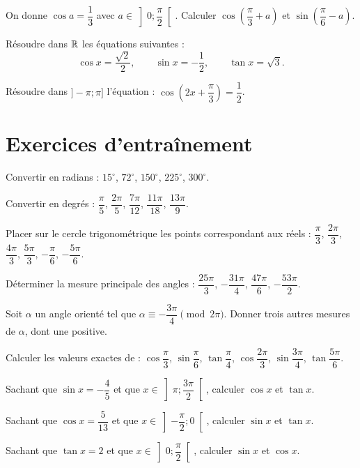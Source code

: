 \exo{}
On donne $\cos a = \dfrac{1}{3}$ avec $a \in \left]0;\dfrac{\pi}{2}\right[$. Calculer $\cos\left(\dfrac{\pi}{3}+a\right)$ et $\sin\left(\dfrac{\pi}{6}-a\right)$.


\exo{}
Résoudre dans $\mathbb{R}$ les équations suivantes :
\[
\cos x = \frac{\sqrt{2}}{2},\qquad \sin x = -\frac{1}{2},\qquad \tan x = \sqrt{3}.
\]

\exo{}
Résoudre dans $]-\pi;\pi]$ l'équation : $\cos\left(2x+\dfrac{\pi}{3}\right) = \dfrac{1}{2}$.

\section{Exercices d'entraînement}


\exo{}
Convertir en radians : $15^\circ$, $72^\circ$, $150^\circ$, $225^\circ$, $300^\circ$.

\exo{}
Convertir en degrés : $\dfrac{\pi}{5}$, $\dfrac{2\pi}{5}$, $\dfrac{7\pi}{12}$, $\dfrac{11\pi}{18}$, $\dfrac{13\pi}{9}$.

\exo{}
Placer sur le cercle trigonométrique les points correspondant aux réels : $\dfrac{\pi}{3}$, $\dfrac{2\pi}{3}$, $\dfrac{4\pi}{3}$, $\dfrac{5\pi}{3}$, $-\dfrac{\pi}{6}$, $-\dfrac{5\pi}{6}$.

\exo{}
Déterminer la mesure principale des angles : $\dfrac{25\pi}{3}$, $-\dfrac{31\pi}{4}$, $\dfrac{47\pi}{6}$, $-\dfrac{53\pi}{2}$.

\exo{}
Soit $\alpha$ un angle orienté tel que $\alpha \equiv -\dfrac{3\pi}{4} \pmod{2\pi}$. Donner trois autres mesures de $\alpha$, dont une positive.


\exo{}
Calculer les valeurs exactes de : $\cos\dfrac{\pi}{3}$, $\sin\dfrac{\pi}{6}$, $\tan\dfrac{\pi}{4}$, $\cos\dfrac{2\pi}{3}$, $\sin\dfrac{3\pi}{4}$, $\tan\dfrac{5\pi}{6}$.

\exo{}
Sachant que $\sin x = -\dfrac{4}{5}$ et que $x \in \left]\pi;\dfrac{3\pi}{2}\right[$, calculer $\cos x$ et $\tan x$.

\exo{}
Sachant que $\cos x = \dfrac{5}{13}$ et que $x \in \left]-\dfrac{\pi}{2};0\right[$, calculer $\sin x$ et $\tan x$.

\exo{}
Sachant que $\tan x = 2$ et que $x \in \left]0;\dfrac{\pi}{2}\right[$, calculer $\sin x$ et $\cos x$.

